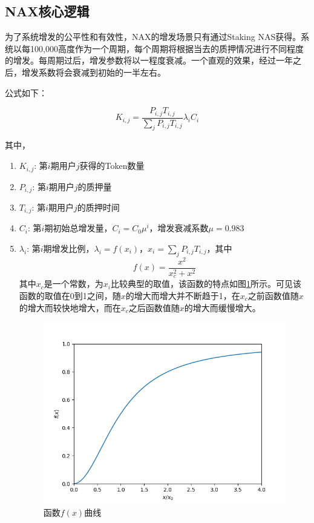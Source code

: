 \subsection{NAX核心逻辑}
为了系统增发的公平性和有效性，NAX的增发场景只有通过Staking NAS获得。系统以每100,000高度作为一个周期，每个周期将根据当去的质押情况进行不同程度的增发。每周期过后，增发参数将以一程度衰减。一个直观的效果，经过一年之后，增发系数将会衰减到初始的一半左右。

公式如下：

\begin{equation}
  K_{i,j} = \frac{P_{i,j} T_{i,j}}{\sum_j P_{i,j} T_{i,j}} \lambda_i C_i
\end{equation}

其中，
\begin{enumerate}
   \item \(K_{i,j}\): 第\(i\)期用户\(j\)获得的Token数量
   \item \(P_{i,j}\): 第\(i\)期用户\(j\)的质押量
   \item \(T_{i,j}\): 第\(i\)期用户\(j\)的质押时间
   \item \(C_i\): 第\(i\)期初始总增发量，\(C_i=C_0 \mu^i\)，增发衰减系数$\mu=0.983$
   \item \(\lambda_i\): 第\(i\)期增发比例，\(\lambda_i = f(x_i)\)，\(x_i = \sum_j P_{i,j} T_{i,j}\)，其中
     \begin{equation}
       f(x) = \frac{x^2}{x_c^2+x^2}
     \end{equation}
     其中\(x_c\)是一个常数，为\(x_i\)比较典型的取值，该函数的特点如图\ref{func}所示。可见该函数的取值在0到1之间，随\(x\)的增大而增大并不断趋于1，在\(x_c\)之前函数值随\(x\)的增大而较快地增大，而在\(x_c\)之后函数值随\(x\)的增大而缓慢增大。
    \begin{figure}
      \centering
      \includegraphics[scale=0.4]{../common/fx.png}
      \caption{函数\(f(x)\)曲线}\label{func}
    \end{figure}
\end{enumerate}
